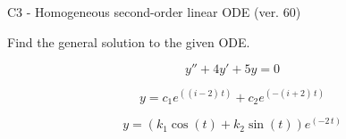 \begin{exercise}
  \begin{exerciseTitle}C3 - Homogeneous second-order linear ODE (ver. 60)\end{exerciseTitle}
  \begin{exerciseStatement}
    
Find the general solution to the given ODE.

    
\[y''+4y'+5y = 0\]

  \end{exerciseStatement}
  \begin{exerciseAnswer}
    
\[y= c_{1} e^{\left(\left(i - 2\right) \, t\right)} + c_{2} e^{\left(-\left(i + 2\right) \, t\right)}\]

    
\[y= {\left(k_{1} \cos\left(t\right) + k_{2} \sin\left(t\right)\right)} e^{\left(-2 \, t\right)}\]

  \end{exerciseAnswer}
\end{exercise}